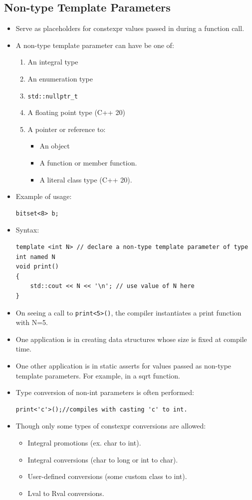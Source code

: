 \documentclass{report}
\begin{document}
\subsection{Non-type Template Parameters}
\begin{itemize}
\item Serve as placeholders for constexpr values passed in during a function call.
\item A non-type template parameter can have be one of:
\begin{enumerate}
    \item An integral type
    \item An enumeration type
    \item \texttt{std::nullptr\_t}
    \item A floating point type (C++ 20)
    \item A pointer or reference to:
    \begin{itemize}
        \item An object
        \item A function or member function.
        \item A literal class type (C++ 20).
    \end{itemize}
\end{enumerate}
\item Example of usage:
\begin{lstlisting}
bitset<8> b;
\end{lstlisting}
\item Syntax:
\begin{lstlisting}
template <int N> // declare a non-type template parameter of type int named N
void print()
{
    std::cout << N << '\n'; // use value of N here
}
\end{lstlisting}
\item On seeing a call to \texttt{print<5>()}, the compiler instantiates a print function with N=5.
\item One application is in creating data structures whose size is fixed at compile time.
\item One other application is in static asserts for values passed as non-type template parameters. For example, in a sqrt function.
\item Type conversion of non-int parameters is often performed:
\begin{lstlisting}
print<'c'>();//compiles with casting 'c' to int.
\end{lstlisting}
\item Though only some types of constexpr conversions are allowed:
\begin{itemize}
    \item Integral promotions (ex. char to int).
    \item Integral conversions (char to long or int to char).
    \item User-defined conversions (some custom class to int).
    \item Lval to Rval conversions.
\end{itemize}
\end{itemize}
\end{document}
